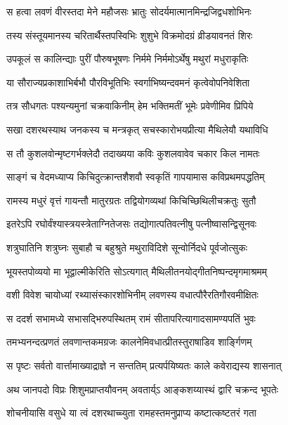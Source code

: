 \twolineshloka
{स हत्वा लवणं वीरस्तदा मेने महौजसः}
{भ्रातुः सोदर्यमात्मानमिन्द्रजिद्वधशोभिनः} %

\twolineshloka
{तस्य संस्तूयमानस्य चरितार्थैस्तपस्विभिः}
{शुशुभे विक्रमोदग्रं व्रीडयावनतं शिरः} %

\twolineshloka
{उपकूलं स कालिन्द्याः पुरीं पौरुषभूषणः}
{निर्ममे निर्ममोऽर्थेषु मथुरां मधुराकृतिः} %

\twolineshloka
{या सौराज्यप्रकाशाभिर्बभौ पौरविभूतिभिः}
{स्वर्गाभिष्यन्दवमनं कृत्वेवोपनिवेशिता} %

\twolineshloka
{तत्र सौधगतः पश्यन्यमुनां चक्रवाकिनीम्}
{हेम भक्तिमतीं भूमेः प्रवेणीमिव प्रिपिये} %

\twolineshloka
{सखा दशरथस्याथ जनकस्य च मन्त्रकृत्}
{सचस्कारोभयप्रीत्या मैथिलेयौ यथाविधि} %

\twolineshloka
{स तौ कुशलवोन्मृष्टगर्भक्लेदौ तदाख्यया}
{कविः कुशलवावेव चकार किल नामतः} %

\twolineshloka
{साङ्गं च वेदमध्याप्य किचिदुत्क्रान्तशैशवौ}
{स्वकृतिं गापयामास कविप्रथमपद्धतिम्} %

\twolineshloka
{रामस्य मधुरं वृत्तं गायन्तौ मातुरग्रतः}
{तद्वियोगव्यथां किचिच्छिथिलीचक्रतुः सुतौ} %

\twolineshloka
{इतरेऽपि रघोर्वंश्यास्त्रयस्त्रेताग्नितेजसः}
{तद्योगात्पतिवत्नीषु पत्नीष्वासन्द्विसूनवः} %

\twolineshloka
{शत्रुघातिनि शत्रुघ्नः सुबाहौ च बहुश्रुते}
{मथुराविदिशे सून्वोर्निदधे पूर्वजोत्सुकः} %

\twolineshloka
{भूयस्तपोव्ययो मा भूद्वाल्मीकेरिति सोऽत्यगात्}
{मैथिलीतनयोद्गीतनिष्पन्दमृगमाश्रमम्} %

\twolineshloka
{वशी विवेश चायोध्यां रथ्यासंस्कारशोभिनीम्}
{लवणस्य वधात्पौरैरतिगौरवमीक्षितः} %

\twolineshloka
{स ददर्श सभामध्ये सभासद्भिरुपस्थितम्}
{रामं सीतापरित्यागादसामण्यपतिं भुवः} %

\twolineshloka
{तमभ्यनन्दत्प्रणतं लवणान्तकमग्रजः}
{कालनेमिवधात्प्रीतस्तुराषाडिव शार्ङ्गिणम्} %

\twolineshloka
{स पृष्टः सर्वतो वार्त्तामाख्याद्राज्ञे न सन्ततिम्}
{प्रत्यर्पयिष्यतः काले कवेराद्यस्य शासनात्} %

\twolineshloka
{अथ जानपदो विप्रः शिशुमप्राप्तयौवनम्}
{अवतार्य्ऽ आङ्कशय्यास्थं द्वारि चक्रन्द भूपतेः} %

\twolineshloka
{शोचनीयासि वसुधे या त्वं दशरथाच्च्युता}
{रामहस्तमनुप्राप्य कष्टात्कष्टतरं गता} %


